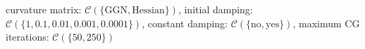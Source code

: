 curvature matrix: $\mathcal{C}(\{\text{GGN},\text{Hessian}\})$, initial damping: $\mathcal{C}(\{1,\num[scientific-notation=true]{0.1},\num[scientific-notation=true]{0.01},\num[scientific-notation=true]{0.001},\num[scientific-notation=true]{0.0001}\})$, constant damping: $\mathcal{C}(\{\text{no},\text{yes}\})$, maximum CG iterations: $\mathcal{C}(\{50,250\})$